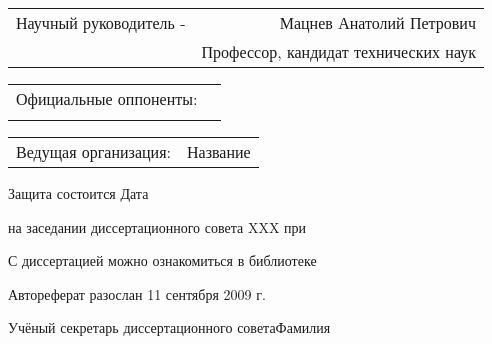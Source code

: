 \noindent
\begin{tabular}{ l r }
Научный руководитель -	& 	Мацнев Анатолий Петрович \\
		 	&	Профессор, кандидат технических наук \\
\end{tabular}

\vspace{\baselineskip}
\vspace{\baselineskip}
\vspace{\baselineskip}

\noindent
\begin{tabular}{ l r }
Официальные оппоненты: 	& 	 \\
		 	&	 \\
\end{tabular}

\vspace{\baselineskip}
\vspace{\baselineskip}
\vspace{\baselineskip}

\noindent
\begin{tabular}{ l r }
Ведущая организация: & Название
\end{tabular}

\vspace{\baselineskip}
\vspace{\baselineskip}
\vspace{\baselineskip}

\noindent
Защита состоится Дата 

\vspace{\baselineskip}
\vspace{\baselineskip}
\vspace{\baselineskip}

\noindent
на заседании диссертационного совета XXX при 

\vspace{\baselineskip}
\vspace{\baselineskip}
\vspace{\baselineskip}

\noindent
С диссертацией можно ознакомиться в библиотеке 

\noindent
Автореферат разослан  11 сентября 2009 г.

\vfill
\noindent
Учёный секретарь диссертационного совета\hfill Фамилия

\newpage


